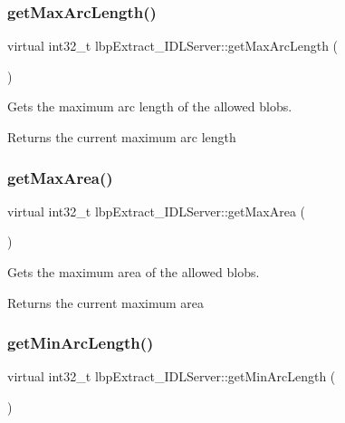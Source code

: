 \subsubsection{\texorpdfstring{get\+Max\+Arc\+Length()}{getMaxArcLength()}}
{\footnotesize\ttfamily virtual int32\+\_\+t lbp\+Extract\+\_\+\+I\+D\+L\+Server\+::get\+Max\+Arc\+Length (\begin{DoxyParamCaption}{ }\end{DoxyParamCaption})\hspace{0.3cm}{\ttfamily [virtual]}}



Gets the maximum arc length of the allowed blobs. 

\begin{DoxyReturn}{Returns}
the current maximum arc length 
\end{DoxyReturn}
\mbox{\label{classlbpExtract__IDLServer_a46c4f38052cd2abd334e4e0f0263fab4}} 
\subsubsection{\texorpdfstring{get\+Max\+Area()}{getMaxArea()}}
{\footnotesize\ttfamily virtual int32\+\_\+t lbp\+Extract\+\_\+\+I\+D\+L\+Server\+::get\+Max\+Area (\begin{DoxyParamCaption}{ }\end{DoxyParamCaption})\hspace{0.3cm}{\ttfamily [virtual]}}



Gets the maximum area of the allowed blobs. 

\begin{DoxyReturn}{Returns}
the current maximum area 
\end{DoxyReturn}
\mbox{\label{classlbpExtract__IDLServer_ae98976e14296fd7fd3596da8faf862d3}} 
\subsubsection{\texorpdfstring{get\+Min\+Arc\+Length()}{getMinArcLength()}}
{\footnotesize\ttfamily virtual int32\+\_\+t lbp\+Extract\+\_\+\+I\+D\+L\+Server\+::get\+Min\+Arc\+Length (\begin{DoxyParamCaption}{ }\end{DoxyParamCaption})\hspace{0.3cm}{\ttfamily [virtual]}}



